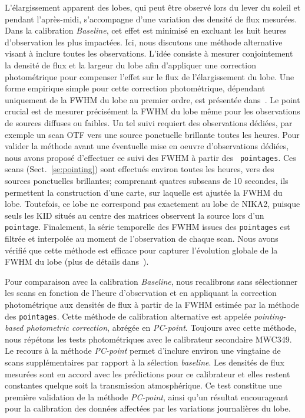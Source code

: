 L'élargissement apparent des lobes, qui peut être observé lors du lever
du soleil et pendant l'après-midi, s'accompagne d'une variation des
densité de flux mesurées. Dans la calibration \emph{Baseline}, cet
effet est minimisé en excluant les huit heures d'observation les plus
impactées. Ici, nous discutons une méthode alternative visant à
inclure toutes les observations. L'idée consiste à mesurer
conjointement la densité de flux et la largeur du lobe afin
d'appliquer une correction photométrique pour compenser l'effet sur le
flux de l'élargissement du lobe. Une forme empirique simple pour cette
correction photométrique, dépendant uniquement de la FWHM du lobe au
premier ordre, est présentée dans~\citet{Perotto2019}. Le point
crucial est de mesurer précisément la FWHM du lobe même pour les
observations de sources diffuses ou faibles. Un tel suivi requiert des
observations dédiées, par exemple un scan OTF vers une source
ponctuelle brillante toutes les heures. Pour valider la méthode avant
une éventuelle mise en oeuvre d'observations dédiées, nous avons
proposé d'effectuer ce suivi des FWHM à partir des {\tt
  pointages}. Ces scans (Sect.~\ref{se:pointing}) sont effectués
environ toutes les heures, vers des sources ponctuelles brillantes;
comprenant quatres subscans de 10 secondes, ils permettent la
construction d'une carte, sur laquelle est ajustée la FWHM du
lobe. Toutefois, ce lobe ne correspond pas exactement au lobe de
NIKA2, puisque seuls les KID situés au centre des matrices observent
la source lors d'un {\tt pointage}. Finalement, la série temporelle
des FWHM issues des {\tt pointages} est filtrée et interpolée au
moment de l'observation de chaque scan. Nous avons vérifié que cette
méthode est efficace pour capturer l'évolution globale de la FWHM du
lobe (plus de détails dans~\citet{Perotto2019}).

Pour comparaison avec la calibration \emph{Baseline}, nous recalibrons
sans sélectionner les scans en fonction de l'heure d'observation et
en appliquant la correction photométrique aux densités de flux à
partir de la FWHM estimée par la méthode des {\tt pointages}. Cette
méthode de calibration alternative est appelée \emph{pointing-based
  photometric correction}, abrégée en \emph{PC-point}. Toujours avec
cette méthode, nous répétons les tests photométriques avec le
calibrateur secondaire MWC349. Le recours à la méthode \emph{PC-point}
permet d'inclure environ une vingtaine de scans supplémentaires par
rapport à la sélection \emph{baseline}. Les densités de flux mesurées
sont en accord avec les prédictions pour ce calibrateur et elles
restent constantes quelque soit la transmission atmosphérique. Ce test
constitue une première validation de la méthode \emph{PC-point}, ainsi
qu'un résultat encourageant pour la calibration des données affectées
par les variations journalières du lobe.



